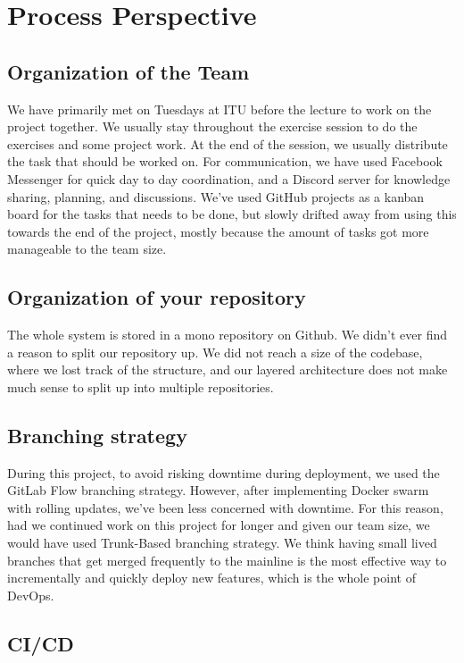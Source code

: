 \section{Process Perspective}

\subsection{Organization of the Team}
We have primarily met on Tuesdays at ITU before the lecture to work on the project together. We usually stay throughout the exercise session to do the exercises and some project work. At the end of the session, we usually distribute the task that should be worked on. For communication, we have used Facebook Messenger for quick day to day coordination, and a Discord server for knowledge sharing, planning, and discussions.
We've used GitHub projects as a kanban board for the tasks that needs to be done, but slowly drifted away from using this towards the end of the project, mostly because the amount of tasks got more manageable to the team size. 


\subsection{Organization of your repository}
The whole system is stored in a mono repository on Github. We didn't ever find a reason to split our repository up. We did not reach a size of the codebase, where we lost track of the structure, and our layered architecture does not make much sense to split up into multiple repositories.


\subsection{Branching strategy}
During this project, to avoid risking downtime during deployment, we used the GitLab Flow branching strategy. However, after implementing Docker swarm with rolling updates, we've been less concerned with downtime. For this reason, had we continued work on this project for
longer and given our team size, we would have used Trunk-Based branching strategy. We think having small lived branches that get merged frequently to the mainline is the most effective way to incrementally and quickly deploy new features, which is the whole point of DevOps.


\subsection{CI/CD}

